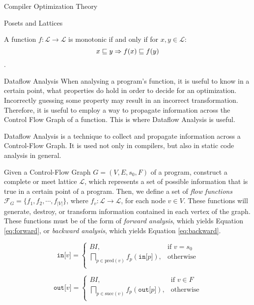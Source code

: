 \begin{section}{Compiler Optimization Theory}
\begin{subsection}{Posets and Lattices}
\begin{definition}
	A function $f:\mathcal{L} \longrightarrow \mathcal{L}$ is monotonic if and only if
	for $x, y \in \mathcal{L}$:
	$$x \sqsubseteq y \Rightarrow f(x) \sqsubseteq f(y)$$.
\end{definition}

\end{subsection}

\begin{subsection}{Dataflow Analysis}
	When analysing a program's function, it is useful to know in a certain point,
	what properties do hold in order to decide for an optimization. Incorrectly
	guessing some property may result in an incorrect transformation. Therefore,
	it is useful to employ a way to propagate information across the Control Flow
	Graph of a function. This is where Dataflow Analysis is useful.

	Dataflow Analysis is a technique to collect and propagate information across a
	Control-Flow Graph. It is used not only in compilers, but also in static
	code analysis in general.

	Given a Control-Flow Graph $G = (V, E, s_0, F)$ of a program, construct
	a complete or meet lattice $\mathcal{L}$, which represents a set of
	possible information that is true in a certain point of a program.
	Then, we define a set of \textit{flow functions}
	$\mathcal{F}_G = \{f_1, f_2, \cdots, f_{|V|}\}$, where $f_v: \mathcal{L} \longrightarrow \mathcal{L}$,
	for each node $v \in V$. These functions will generate, destroy, or transform information contained in each vertex of the graph. These functions must be of the form of \textit{forward
	analysis}, which yields Equation \ref{eq:forward}, or \textit{backward analysis},
	which yields Equation \ref{eq:backward}.

\begin{equation}\label{eq:forward}
	\texttt{in[} v \texttt{]} = \begin{cases}
	  BI,& \text{if } v = s_0 \\
	  \bigsqcap_{p \in \text{pred}(v)}f_p(\texttt{in[}p\texttt{]}) ,& \text{otherwise} \\
	\end{cases}
\end{equation}

\begin{equation}\label{eq:backward}
	\texttt{out[} v \texttt{]} = \begin{cases}
	  BI,& \text{if } v \in F \\
	  \bigsqcap_{p \in \text{succ}(v)}f_p(\texttt{out[}p\texttt{]}) ,& \text{otherwise} \\
	\end{cases}
\end{equation}


\end{subsection}
\end{section}
